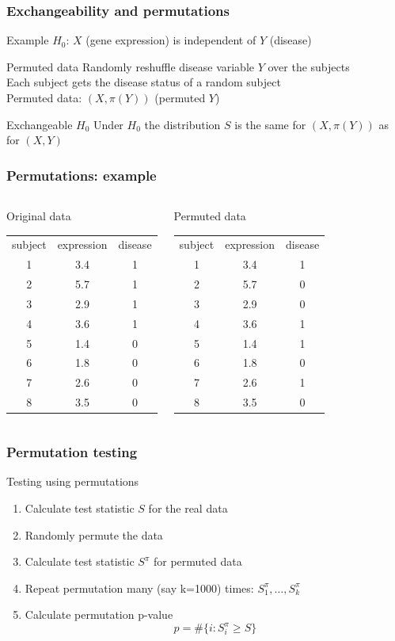 \documentclass[compress]{beamer}
\newcommand{\bb}[1]{\begin{block}{#1}}
\newcommand{\eb}{\end{block}}
\newcommand{\be}{\begin {enumerate}}
\newcommand{\ee}{\end{enumerate}}
\newcommand{\bfr}[1]{\begin{frame} \frametitle{#1}}
\begin{document}
\bfr{Exchangeability and permutations}
  \bb{Example}
    $H_0$: $X$ (gene expression) is independent of $Y$ (disease)
  \eb
  \bb{Permuted data}
    Randomly reshuffle disease variable $Y$ over the subjects
    \\ Each subject gets the disease status of a random subject
    \\ Permuted data: $(X, \pi(Y))$ (permuted $Y$)
  \eb
  \bb{Exchangeable $H_0$}
    Under $H_0$ the distribution $S$ is the same for $(X, \pi(Y))$ as for $(X, Y)$
  \eb
\end{frame}


\bfr{Permutations: example}
  \begin{columns}
    \bb{Original data}
      \begin{tabular}{ccc}
        subject & expression & disease \\
        1 & 3.4 & 1 \\
        2 & 5.7 & 1 \\
        3 & 2.9 & 1 \\
        4 & 3.6 & 1 \\
        5 & 1.4 & 0 \\
        6 & 1.8 & 0 \\
        7 & 2.6 & 0 \\
        8 & 3.5 & 0
      \end{tabular}
    \eb
    \bb{Permuted data}
      \begin{tabular}{ccc}
        subject & expression & disease \\
        1 & 3.4 & 1 \\
        2 & 5.7 & 0 \\
        3 & 2.9 & 0 \\
        4 & 3.6 & 1 \\
        5 & 1.4 & 1 \\
        6 & 1.8 & 0 \\
        7 & 2.6 & 1 \\
        8 & 3.5 & 0
      \end{tabular}
    \eb
  \end{columns}
\end{frame}

\bfr{Permutation testing}
  \bb{Testing using permutations}
    \be
      \item Calculate test statistic $S$ for the real data
      \item Randomly permute the data
      \item Calculate test statistic $S^\pi$ for permuted data
      \item Repeat permutation many (say k=1000) times: $S^\pi_1, \ldots, S^\pi_k$
      \item Calculate permutation p-value
      \[ p = \#\{i: S^\pi_i \geq S\} \]
    \ee
  \eb
\end{frame}
\end{document}
